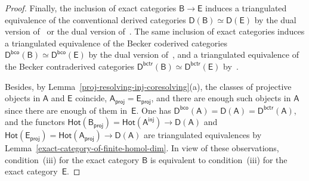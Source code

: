 \documentclass[12pt,a4paper]{amsart}
\newcommand{\+}{\nobreakdash-}
\renewcommand{\:}{\colon}
\newcommand{\rarrow}{\longrightarrow}
\newcommand{\sA}{\mathsf A}
\newcommand{\sB}{\mathsf B}
\newcommand{\sD}{\mathsf D}
\newcommand{\sE}{\mathsf E}
\newcommand{\Hot}{\mathsf{Hot}}
\newcommand{\proj}{\mathsf{proj}}
\newcommand{\inj}{\mathsf{inj}}
\newcommand{\bco}{\mathsf{bco}}
\newcommand{\bctr}{\mathsf{bctr}}
\theoremstyle{plain}
\theoremstyle{definition}
\begin{document}
\begin{proof}
 Finally, the inclusion of exact categories $\sB\rarrow\sE$ induces
a triangulated equivalence of the conventional derived categories
$\sD(\sB)\simeq\sD(\sE)$ by the dual version
of~\cite[Proposition~5.14]{Sto0} or the dual version
of~\cite[Proposition~A.5.8]{Pcosh}.
 The same inclusion of exact categories induces a triangulated
equivalence of the Becker coderived categories $\sD^\bco(\sB)
\simeq\sD^\bco(\sE)$ by the dual version
of~\cite[Proposition~B.7.9]{Pcosh}, and a triangulated equivalence of
the Becker contraderived categories $\sD^\bctr(\sB)\simeq
\sD^\bctr(\sE)$ by~\cite[Proposition~B.7.10]{Pcosh}.

 Besides, by Lemma~\ref{proj-resolving-inj-coresolving}(a), the classes
of projective objects in $\sA$ and $\sE$ coincide,
$\sA_\proj=\sE_\proj$, and there are enough such objects in $\sA$ since
there are enough of them in~$\sE$.
 One has $\sD^\bco(\sA)=\sD(\sA)=\sD^\bctr(\sA)$, and
the functors $\Hot(\sB_\proj)=\Hot(\sA^\inj)\rarrow\sD(\sA)$ and
$\Hot(\sE_\proj)=\Hot(\sA_\proj)\rarrow\sD(\sA)$ are triangulated
equivalences by Lemma~\ref{exact-category-of-finite-homol-dim}.
 In view of these observations, condition~(iii) for the exact category
$\sB$ is equivalent to condition~(iii) for the exact category~$\sE$.
\end{proof}
\end{document}

